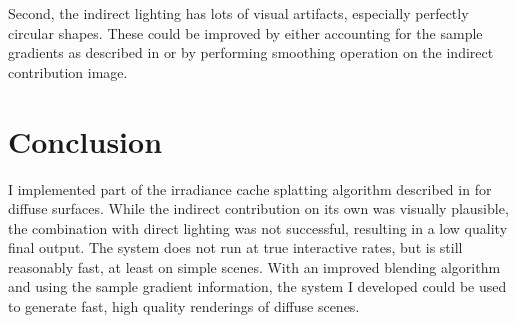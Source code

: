 \documentclass[10pt,twopage]{acmsiggraph}
\begin{document}
Second, the indirect lighting has lots of visual artifacts, especially perfectly circular shapes.  These could be improved by either accounting for the sample gradients as described in \cite{mainpaper} or by performing smoothing operation on the indirect contribution image.  

\section{Conclusion}
I implemented part of the irradiance cache splatting algorithm described in \cite{mainpaper} for diffuse surfaces.  While the indirect contribution on its own was visually plausible, the combination with direct lighting was not successful, resulting in a low quality final output.  The system does not run at true interactive rates, but is still reasonably fast, at least on simple scenes.  With an improved blending algorithm and using the sample gradient information, the system I developed could be used to generate fast, high quality renderings of diffuse scenes.



{\small}

%
%


\cleardoublepage
\end{document}
